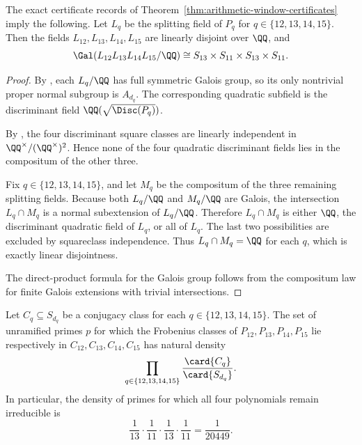 \begin{theorem}[Linear disjointness for \texorpdfstring{$q=12,13,14,15$}{q=12,13,14,15}]
\label{thm:linear-disjointness}
The exact certificate records of
Theorem~\ref{thm:arithmetic-window-certificates} imply the following.  Let
\(L_q\) be the splitting field of \(P_q\) for
\(q\in\{12,13,14,15\}\).  Then the fields \(L_{12},L_{13},L_{14},L_{15}\) are
linearly disjoint over \(\QQ\), and
\[
  \Gal(L_{12}L_{13}L_{14}L_{15}/\QQ)
  \cong
  S_{13}\times S_{11}\times S_{13}\times S_{11}.
\]
\end{theorem}

\begin{proof}
By , each \(L_q/\QQ\) has full symmetric Galois
group, so its only nontrivial proper normal subgroup is \(A_{d_q}\).  The
corresponding quadratic subfield is the discriminant field
\(\QQ(\sqrt{\Disc(P_q)})\).

By , the four discriminant square
classes are linearly independent in \(\QQ^\times/(\QQ^\times)^2\).  Hence none
of the four quadratic discriminant fields lies in the compositum of the other
three.

Fix \(q\in\{12,13,14,15\}\), and let \(M_q\) be the compositum of the three
remaining splitting fields.  Because both \(L_q/\QQ\) and \(M_q/\QQ\) are
Galois, the intersection \(L_q\cap M_q\) is a normal subextension of
\(L_q/\QQ\).  Therefore \(L_q\cap M_q\) is either \(\QQ\), the discriminant
quadratic field of \(L_q\), or all of \(L_q\).  The last two possibilities are
excluded by squareclass independence.  Thus \(L_q\cap M_q=\QQ\) for each \(q\),
which is exactly linear disjointness.

The direct-product formula for the Galois group follows from the compositum law
for finite Galois extensions with trivial intersections.
\end{proof}

\begin{corollary}
\label{cor:chebotarev-product}
Let \(C_q\subseteq S_{d_q}\) be a conjugacy class for each
\(q\in\{12,13,14,15\}\).  The set of unramified primes \(p\) for which the
Frobenius classes of \(P_{12},P_{13},P_{14},P_{15}\) lie respectively in
\(C_{12},C_{13},C_{14},C_{15}\) has natural density
\[
  \prod_{q\in\{12,13,14,15\}}\frac{\card{C_q}}{\card{S_{d_q}}}.
\]
In particular, the density of primes for which all four polynomials remain
irreducible is
\[
  \frac{1}{13}\cdot\frac{1}{11}\cdot\frac{1}{13}\cdot\frac{1}{11}
  =\frac{1}{20449}.
\]
\end{corollary}

